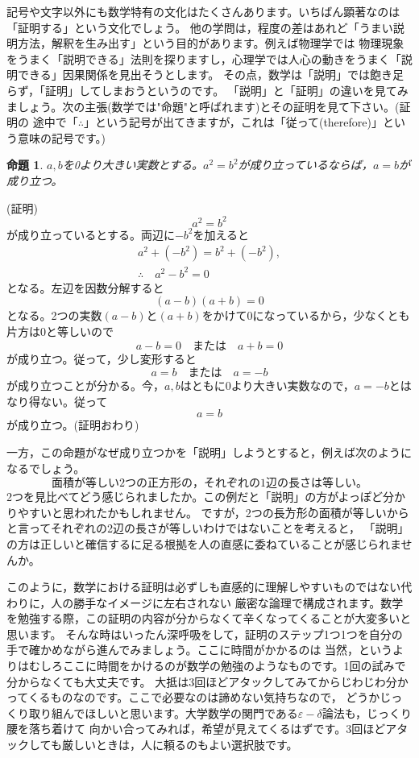 \documentclass[./main]{subfiles}
\newtheorem{thm}{命題}
\begin{document}
記号や文字以外にも数学特有の文化はたくさんあります。いちばん顕著なのは「証明する」という文化でしょう。
他の学問は，程度の差はあれど「うまい説明方法，解釈を生み出す」という目的があります。例えば物理学では
物理現象をうまく「説明できる」法則を探りますし，心理学では人心の動きをうまく「説明できる」因果関係を見出そうとします。
その点，数学は「説明」では飽き足らず，「証明」してしまおうというのです。
「説明」と「証明」の違いを見てみましょう。次の主張(数学では"命題"と呼ばれます)とその証明を見て下さい。(証明の
途中で「$\therefore$」という記号が出てきますが，これは「従って(therefore)」という意味の記号です。)

\begin{thm}
$a,b$を0より大きい実数とする。$a^2 = b^2$が成り立っているならば，$a = b$が成り立つ。
\end{thm}
(証明)
\[a^2 = b^2 \]
が成り立っているとする。両辺に$-b^2$を加えると
\begin{gather*}
a^2 + (-b^2) = b^2 + (-b^2), \\
\therefore \quad a^2 - b^2 = 0
\end{gather*}
となる。左辺を因数分解すると
\[
(a-b)(a+b) = 0
\]
となる。2つの実数$(a-b)と(a+b)$をかけて0になっているから，少なくとも片方は0と等しいので
\[
a-b=0 \quad または\quad a+b=0
\]
が成り立つ。従って，少し変形すると
\[
a=b \quad または \quad a=-b
\]
が成り立つことが分かる。今，$a,b$はともに0より大きい実数なので，$a=-b$とはなり得ない。従って
\[
a=b
\]
が成り立つ。(証明おわり)

一方，この命題がなぜ成り立つかを「説明」しようとすると，例えば次のようになるでしょう。
\[
面積が等しい2つの正方形の，それぞれの1辺の長さは等しい。
\]
2つを見比べてどう感じられましたか。この例だと「説明」の方がよっぽど分かりやすいと思われたかもしれません。
ですが，2つの\.{長}\.{方}\.{形}の面積が等しいからと言ってそれぞれの2辺の長さが等しいわけではないことを考えると，
「説明」の方は正しいと確信するに足る根拠を人の直感に委ねていることが感じられませんか。

このように，数学における証明は必ずしも直感的に理解しやすいものではない代わりに，人の勝手なイメージに左右されない
厳密な論理で構成されます。数学を勉強する際，この証明の内容が分からなくて辛くなってくることが大変多いと思います。
そんな時はいったん深呼吸をして，証明のステップ1つ1つを自分の手で確かめながら進んでみましょう。ここに時間がかかるのは
当然，というよりはむしろここに時間をかけるのが数学の勉強のようなものです。1回の試みで分からなくても大丈夫です。
大抵は3回ほどアタックしてみてからじわじわ分かってくるものなのです。ここで必要なのは諦めない気持ちなので，
どうかじっくり取り組んでほしいと思います。大学数学の関門である$\varepsilon-\delta$論法も，じっくり腰を落ち着けて
向かい合ってみれば，希望が見えてくるはずです。3回ほどアタックしても厳しいときは，人に頼るのもよい選択肢です。
\end{document}
